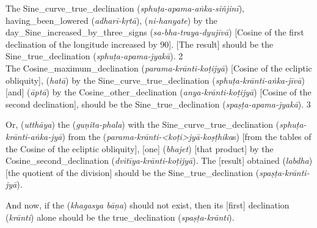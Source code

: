 \noindent\reversemarginpar{}%
The \gls{Sine_curve_true_declination} (\textit{sphuṭa-apama-aṅka-siñjinī}), \gls{having_been_lowered} (\textit{adharī-kṛtā}),  (\textit{ni-hanyate}) by the \gls{day_Sine_increased_by_three_signs} (\textit{sa-bha-traya-dyujīvā}) [\ie Cosine of the first declination of the longitude increased by 90\degree]. [The result] should be the \gls{Sine_true_declination} (\textit{sphuṭa-apama-jyakā}). 2
\\[.65\baselineskip]

\noindent\reversemarginpar{}%
The \gls{Cosine_maximum_declination} (\textit{parama-krānti-koṭijyā}) [\ie Cosine of the ecliptic obliquity],  (\textit{hatā}) by the \gls{Sine_curve_true_declination} (\textit{sphuṭa-krānti-aṅka-jīvā}) [and]  (\textit{āptā}) by the \gls{Cosine_other_declination} (\textit{anya-krānti-koṭijyā}) [\ie Cosine of the second declination], should be the \gls{Sine_true_declination} (\textit{spaṣṭa-apama-jyakā}). 3 
\medskip

\noindent\reversemarginpar{}%
Or,  (\textit{utthāya}) the  (\textit{guṇita-phala}) with the \gls{Sine_curve_true_declination} (\textit{sphuṭa-krānti-aṅka-jyā}) from the  (\textit{parama-krānti-<koṭi>jyā-koṣṭhika}s) [\ie from the tables of the Cosine of the ecliptic obliquity], [one]  (\textit{bhajet}) [that product] by the \gls{Cosine_second_declination} (\textit{dvitīya-krānti-koṭijyā}). The [result] \gls{obtained} (\textit{labdha}) [\ie the quotient of the division] should be the \gls{Sine_true_declination} (\textit{spaṣṭa-krānti-jyā}).  
\medskip

\noindent\reversemarginpar{}%
And now, if the  (\textit{khagasya bāṇa}) should not exist, then its [first] \gls{declination} (\textit{krānti}) alone should be the \gls{true_declination} (\textit{spaṣṭa-krānti}). 


\clearpage{}

